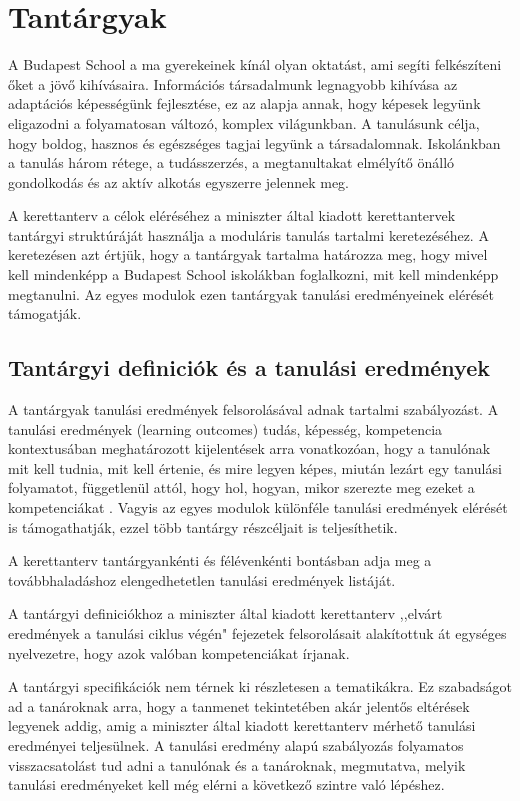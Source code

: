 \section{Tantárgyak}
\label{sec:tantargyak}
A Budapest School a ma gyerekeinek kínál olyan oktatást, ami segíti felkészíteni őket a jövő kihívásaira. Információs társadalmunk legnagyobb kihívása az adaptációs képességünk fejlesztése, ez az alapja annak, hogy képesek legyünk eligazodni a folyamatosan változó, komplex világunkban. A tanulásunk célja, hogy boldog, hasznos és egészséges tagjai legyünk a társadalomnak. Iskolánkban a tanulás három rétege, a tudásszerzés, a megtanultakat elmélyítő önálló gondolkodás és az aktív alkotás egyszerre jelennek meg.

A kerettanterv a célok eléréséhez a miniszter által kiadott kerettantervek tantárgyi struktúráját használja  a moduláris tanulás tartalmi keretezéséhez. A keretezésen azt értjük, hogy a tantárgyak tartalma határozza meg, hogy mivel kell mindenképp a Budapest School iskolákban foglalkozni, mit kell mindenképp megtanulni. 
Az egyes modulok ezen tantárgyak tanulási eredményeinek elérését támogatják.


\subsection{Tantárgyi definiciók és a tanulási eredmények}
A tantárgyak tanulási eredmények felsorolásával adnak tartalmi szabályozást. A tanulási eredmények (learning outcomes) tudás, képesség, kompetencia kontextusában meghatározott kijelentések arra vonatkozóan, hogy a tanulónak mit kell tudnia, mit kell értenie, és mire legyen képes, miután lezárt egy tanulási folyamatot, függetlenül attól, hogy hol, hogyan, mikor szerezte meg ezeket a kompetenciákat \citep{learning_outcomes}.  Vagyis  az egyes modulok különféle tanulási eredmények elérését is támogathatják, ezzel több tantárgy részcéljait is teljesíthetik.

A kerettanterv tantárgyankénti és félévenkénti bontásban adja meg a továbbhaladáshoz elengedhetetlen tanulási eredmények listáját.

A tantárgyi definiciókhoz a miniszter által kiadott kerettanterv ,,elvárt eredmények a tanulási ciklus végén" fejezetek felsorolásait alakítottuk át egységes nyelvezetre, hogy azok valóban kompetenciákat írjanak.

A tantárgyi specifikációk nem térnek ki rész\-letesen a tematikákra. Ez szabadságot ad a tanároknak arra, hogy a tanmenet tekintetében akár jelentős eltérések legyenek addig, amig a miniszter által kiadott kerettanterv mérhető tanulási eredményei teljesülnek. A tanulási eredmény alapú szabályozás folyamatos visszacsatolást tud adni a tanulónak és a tanároknak, megmutatva, melyik tanulási eredményeket kell még elérni a következő szintre való lépéshez.

